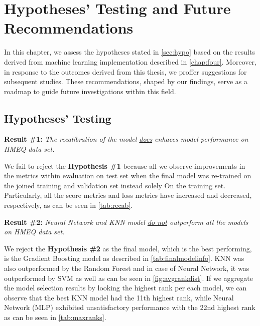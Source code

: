 \chapter{Hypotheses' Testing and Future Recommendations}
\label{chap:five}
In this chapter, we assess the hypotheses stated in \autoref{sec:hypo} based on the results derived from machine learning implementation described in \autoref{chap:four}.
Moreover, in response to the outcomes derived from this thesis, we proffer suggestions for subsequent studies. These recommendations, shaped by our findings, serve as a roadmap to guide future investigations within this field.

\section{Hypotheses' Testing}
\noindent \textbf{Result \#1:} \textit{The recalibration of the model \underline{does} enhaces model performance on HMEQ data set.}

We fail to reject the \textbf{Hypothesis \#1} because all we observe improvements in the metrics within evaluation on test set when the final model was re-trained on the joined training and validation set instead solely On the training set.
Particularly, all the score metrics and loss metrics have increased and decreased, respectively, as can be seen in \autoref{tab:recab}.

\vspace{0.3cm}

\noindent \textbf{Result \#2:} \textit{Neural Network and KNN model \underline{do not} outperform all the models on HMEQ data set.}

We reject the \textbf{Hypothesis \#2} as the final model, which is the best performing, is the Gradient Boosting model as described in \autoref{tab:finalmodelinfo}.
KNN was also outperformed by the Random Forest and in case of Neural Network, it was outperformed by SVM as well as can be seen in 
\autoref{fig:avgrankdist}.
If we aggregate the model selection results by looking the highest rank per each model, we can observe that the best KNN model had the 11th highest rank, while Neural Network (MLP) exhibited unsatisfactory performance with the 22nd highest rank as can be seen in \autoref{tab:maxranks}.


